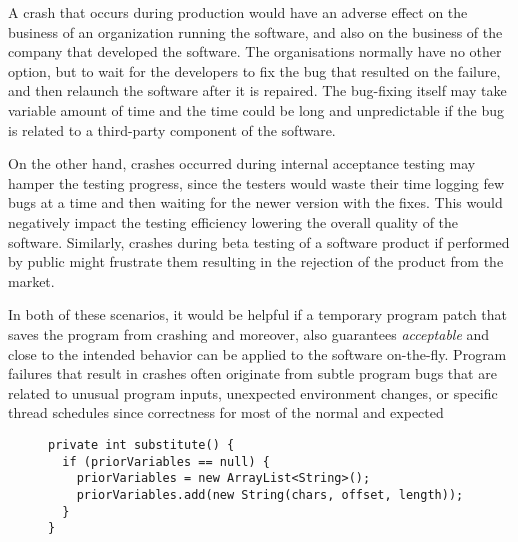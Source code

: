 A crash that occurs during production would
have an adverse effect on the business of an organization running the software,
and also on the business
of the company that developed the software. The organisations normally have no
other option, but to wait for the
developers to fix the bug that resulted on the failure, and then relaunch the
software after it is repaired. The bug-fixing
itself may take variable amount of time and the time could be long and
unpredictable if the bug is related to a third-party
component of the software.


On the other hand,
crashes occurred during internal acceptance testing may hamper the 
testing progress, since the testers would waste their time logging few bugs at a
time and then waiting for the newer version with the fixes.
This would negatively impact the testing efficiency lowering the overall quality
of the software.
Similarly, crashes during beta testing of a software product if performed by
public might frustrate them 
resulting in the rejection of the product from the market.

In both of these scenarios, it would be helpful if a temporary program patch
that saves the program from crashing
and moreover, also guarantees \textit{acceptable} and close to the intended
behavior
can be applied to the software on-the-fly. Program failures that result in
crashes often originate from subtle
program bugs that are related to unusual program inputs, unexpected environment
changes, or specific
thread schedules since correctness for most of the normal and expected 




\lstset{language=Java , caption=Apache Log4j bug example.,
label=snippet:exampleRepairing1}
\begin{figure}[t]
\begin{lstlisting}
private int substitute() {
  if (priorVariables == null) {
    priorVariables = new ArrayList<String>();
    priorVariables.add(new String(chars, offset, length));
  }
}
\end{lstlisting}
\end{figure}

